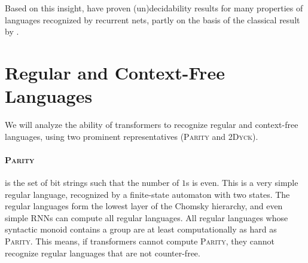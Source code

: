 \documentclass[11pt,a4paper]{article}
\newcounter{theorem}
\begin{document}
Based on this insight, \citet{chen2017recurrent} have proven (un)decidability results for many properties of languages recognized by recurrent nets, partly on the basis of the classical result by \citet{siegelman1991neural}.







\section{Regular and Context-Free Languages} %

We will analyze the ability of transformers to recognize regular and context-free languages, using two prominent representatives (\textsc{Parity} and \textsc{2Dyck}). %


\paragraph{\textsc{Parity}} is the set of bit strings such that the number of $1$s is even.
This is a very simple regular language, recognized by a finite-state automaton with two states.
The regular languages form the lowest layer of the Chomsky hierarchy, and even simple RNNs can compute all regular languages.
All regular languages whose syntactic monoid contains a group are at least computationally as hard as \textsc{Parity}.
This means, if transformers cannot compute \textsc{Parity}, they cannot recognize regular languages that are not counter-free.
\end{document}
